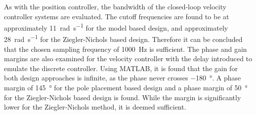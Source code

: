 \documentclass[../../main.tex]{subfiles}
\begin{document}
As with the position controller, the bandwidth of the closed-loop velocity controller systems are evaluated. The cutoff frequencies are found to be at approximately \SI{11}{\radian \per \second} for the model based design, and approximately \SI{28}{\radian \per \second} for the Ziegler-Nichols based design. Therefore it can be concluded that the chosen sampling frequency of \SI{1000}{\hertz} is sufficient. 
The phase and gain margins are also examined for the velocity controller with the delay introduced to emulate the discrete controller. Using MATLAB, it is found that the gain for both design approaches is infinite, as the phase never crosses \SI{-180}{\degree}. A phase margin of \SI{145}{\degree} for the pole placement based design and a phase margin of \SI{50}{\degree} for the Ziegler-Nichols based design is found. While the margin is significantly lower for the Ziegler-Nichols method, it is deemed sufficient.


\end{document}
